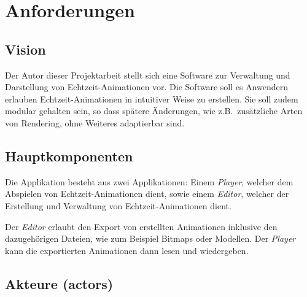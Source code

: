 
\section{Anforderungen}
\label{sec:requirements}

\subsection{Vision}
\label{subsec::requirements:vision}

Der Autor dieser Projektarbeit stellt sich eine Software zur Verwaltung und
Darstellung von Echtzeit-Animationen vor. Die Software soll es Anwendern erlauben
Echtzeit-Animationen in intuitiver Weise zu erstellen. Sie soll zudem modular
gehalten sein, so dass spätere Änderungen, wie z.B.\ zusätzliche Arten von
Rendering, ohne Weiteres adaptierbar sind.


\subsection{Hauptkomponenten}
\label{subsec::requirements:main-components}

Die Applikation besteht aus zwei Applikationen: Einem \textit{Player},
welcher dem Abspielen von Echtzeit-Animationen dient, sowie einem \textit{Editor},
welcher der Erstellung und Verwaltung von Echtzeit-Animationen dient.

Der \textit{Editor} erlaubt den Export von erstellten Animationen inklusive den
dazugehörigen Dateien, wie zum Beispiel Bitmaps oder Modellen. Der
\textit{Player} kann die exportierten Animationen dann lesen und wiedergeben.

\subsection{Akteure (actors)}
\label{subsec::requirements:actors}

